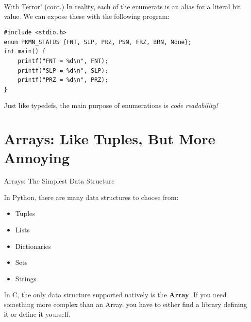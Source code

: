 \documentclass[11pt]{beamer}
\let\OldTexttt\texttt
\renewcommand{\texttt}[1]{\OldTexttt{\color{teal}{#1}}}
\begin{document}
\begin{frame}[fragile=singleslide]{\texttt{enum} With Terror! (cont.)}
In reality, each of the enumerats is an alias for a literal bit value.  We can expose these with the following program:
\begin{lstlisting}[style=C]
#include <stdio.h>
enum PKMN_STATUS {FNT, SLP, PRZ, PSN, FRZ, BRN, None}; 
int main() {
	printf("FNT = %d\n", FNT);
	printf("SLP = %d\n", SLP);
	printf("PRZ = %d\n", PRZ);
}
\end{lstlisting}
Just like typedefs, the main purpose of enumerations is \emph{code readability!} 
\end{frame}


\section[Arrays]{Arrays: Like Tuples, But More Annoying} %
\begin{frame}{Arrays: The Simplest Data Structure}

In Python, there are many data structures to choose from:
\begin{itemize}
\item Tuples
\item Lists
\item Dictionaries
\item Sets
\item Strings
\end{itemize}
In C, the only data structure supported natively is the \textbf{Array}.  If you need something more complex than an Array, you have to either find a library defining it or define it yourself. 
\end{frame}
\end{document}
